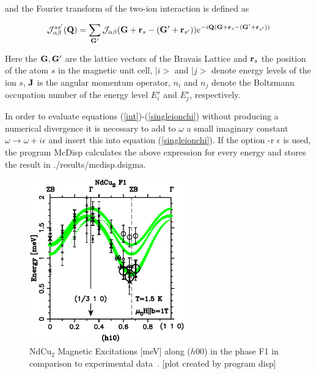 and the Fourier transform of the two-ion interaction is defined as

\begin{equation}
{\mathcal J}_{\alpha\beta}^{ss'}({\mbf Q})=\sum_{\mbf G'} {\mathcal J}_{\alpha\beta}(\mbf G+\mbf r_s-(\mbf G'+\mbf %
r_{s'})) e^{-i\mbf Q(\mbf G+\mbf r_s-(\mbf G'+\mbf r_{s'}))}
\end{equation}

Here the $\mathbf G,\mathbf G'$ are the lattice vectors of the Bravais Lattice and 
$\mathbf r_s$ the position of the atom $s$ in the magnetic unit cell,
 $|i>$ and $|j>$ denote energy levels of the ion
$s$, $\mathbf J$ is the angular momentum operator,
$n_i$ and $n_j$ denote the Boltzmann occupation number of the
energy level $E^s_i$ and $E^s_j$, respectively.


In order to evaluate
 equations
(\ref{int})-(\ref{singleionchi}) without producing a numerical divergence 
it is necessary to add to $\omega$ a small imaginary constant $\omega \rightarrow \omega+i\epsilon$
and insert this into equation (\ref{singleionchi}). 
If the option {\prg -r $\epsilon$} is used,
the program {\prg McDisp} calculates the above expression for every energy
and stores the result in {\prg ./results/mcdisp.dsigma}. 


\begin{figure}[tb]%
\begin{center}\leavevmode
\includegraphics[angle=0, width=0.6\textwidth]{figsrc/dispF1.ps}
\end{center}
\caption{\label{dispF1}NdCu$_2$ Magnetic Excitations [meV] along ($h$00) in the phase F1 in comparison to experimental %
data~\cite{rotter02-751}.
[plot created by program {\prg disp}]}
\end{figure}


